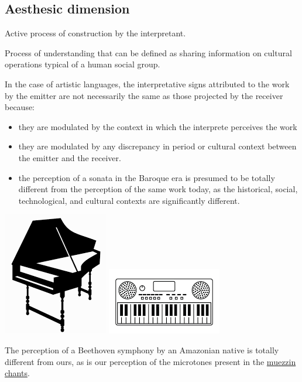 \subsection{Aesthesic dimension}\label{aesthesic-dimension}

Active process of construction by the interpretant.

Process of understanding that can be defined as sharing information on cultural operations typical of a human social group.

In the case of artistic languages, the interpretative signs attributed to the work by the emitter are not necessarily the same as those projected by the receiver because:

\begin{itemize}
\tightlist
\item they are modulated by the context in which the interprete perceives the work
\item they are modulated by any discrepancy in period or cultural context between the emitter and the receiver.
\item the perception of a sonata in the Baroque era is presumed to be totally different from the perception of the same work today, as the historical, social, technological, and cultural contexts are significantly different.
\end{itemize}

\begin{center}
\includegraphics[scale=0.45]{../img/barocca.png}
\includegraphics[scale=0.65]{../img/moderna.png}
\end{center}

The perception of a Beethoven symphony by an Amazonian native is totally different from ours, as is our perception of the microtones present in the \href{https://github.com/musicaecodice/EMC/blob/main/1_premises/suoni/muezzin.mp3}{muezzin chants}.


